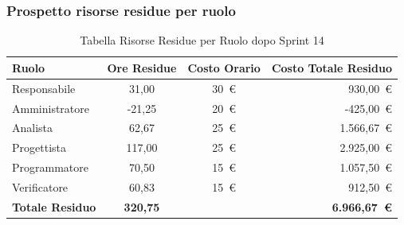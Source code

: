 \subsubsection{Prospetto risorse residue per ruolo}
\begin{table}[H]
    \centering
    \renewcommand{\arraystretch}{1.3}
    \begin{tabularx}{\textwidth}{|X|c|c|r|}
        \hline
        \textbf{Ruolo} & \textbf{Ore Residue} & \textbf{Costo Orario} &
        \textbf{Costo Totale Residuo} \\
        \hline
        Responsabile   & 31,00 & 30~\euro & 930{,}00~\euro \\
        Amministratore & -21,25 & 20~\euro & -425{,}00~\euro \\
        Analista       & 62,67 & 25~\euro & 1.566{,}67~\euro \\
        Progettista    & 117,00 & 25~\euro & 2.925{,}00~\euro \\
        Programmatore  & 70,50 & 15~\euro & 1.057{,}50~\euro \\
        Verificatore   & 60,83 & 15~\euro & 912{,}50~\euro \\
        \hline
        \textbf{Totale Residuo} & \textbf{320,75} & &
        \textbf{6.966{,}67~\euro} \\
        \hline
    \end{tabularx}
    \caption{Tabella Risorse Residue per Ruolo dopo Sprint 14}
\end{table}

